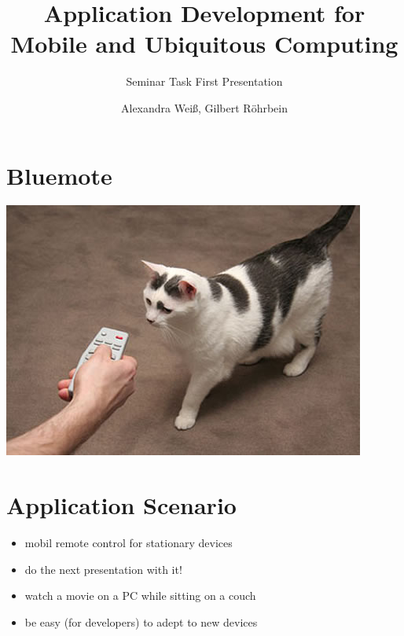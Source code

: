 \documentclass[ddc nogerman]{tudbeamer}
\begin{document}

\title{Application Development for Mobile and Ubiquitous Computing}
\subtitle{Seminar Task First Presentation}
\author{Alexandra Weiß, Gilbert Röhrbein}

\maketitle

\section{Bluemote}
\begin{frame}
\end{frame}

\begin{frame}
    \includegraphics[height=\textheight]{img/remotecat.jpg}
\end{frame}

\section{Application Scenario}
\begin{frame}
    \begin{itemize}
        \item mobil remote control for stationary devices
        \item do the next presentation with it!
        \item watch a movie on a PC while sitting on a couch
        \item be easy (for developers) to adept to new devices
    \end{itemize}
\end{frame}
\end{document}
